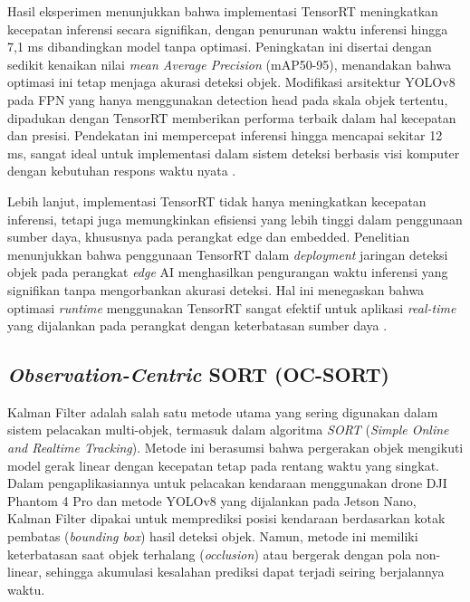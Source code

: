 Hasil eksperimen menunjukkan bahwa implementasi TensorRT meningkatkan kecepatan inferensi secara signifikan, dengan penurunan waktu inferensi hingga 7,1 ms dibandingkan model tanpa optimasi. Peningkatan ini disertai dengan sedikit kenaikan nilai \emph{mean Average Precision} (mAP50-95), menandakan bahwa optimasi ini tetap menjaga akurasi deteksi objek. Modifikasi arsitektur YOLOv8 pada FPN yang hanya menggunakan detection head pada skala objek tertentu, dipadukan dengan TensorRT memberikan performa terbaik dalam hal kecepatan dan presisi. Pendekatan ini mempercepat inferensi hingga mencapai sekitar 12 ms, sangat ideal untuk implementasi dalam sistem deteksi berbasis visi komputer dengan kebutuhan respons waktu nyata \cite{tensorrt}.

Lebih lanjut, implementasi TensorRT tidak hanya meningkatkan kecepatan inferensi, tetapi juga memungkinkan efisiensi yang lebih tinggi dalam penggunaan sumber daya, khususnya pada perangkat edge dan embedded. Penelitian menunjukkan bahwa penggunaan TensorRT dalam \emph{deployment} jaringan deteksi objek pada perangkat \emph{edge} AI menghasilkan pengurangan waktu inferensi yang signifikan tanpa mengorbankan akurasi deteksi. Hal ini menegaskan bahwa optimasi \emph{runtime} menggunakan TensorRT sangat efektif untuk aplikasi \emph{real-time} yang dijalankan pada perangkat dengan keterbatasan sumber daya \cite{stacker2021deployment}.


\subsection{\emph{Observation-Centric} SORT (OC-SORT)}
Kalman Filter adalah salah satu metode utama yang sering digunakan dalam sistem pelacakan multi-objek, termasuk dalam algoritma \emph{SORT} (\emph{Simple Online and Realtime Tracking}). Metode ini berasumsi bahwa pergerakan objek mengikuti model gerak linear dengan kecepatan tetap pada rentang waktu yang singkat. Dalam pengaplikasiannya untuk pelacakan kendaraan menggunakan drone DJI Phantom 4 Pro dan metode YOLOv8 yang dijalankan pada Jetson Nano, Kalman Filter dipakai untuk memprediksi posisi kendaraan berdasarkan kotak pembatas (\emph{bounding box}) hasil deteksi objek. Namun, metode ini memiliki keterbatasan saat objek terhalang (\emph{occlusion}) atau bergerak dengan pola non-linear, sehingga akumulasi kesalahan prediksi dapat terjadi seiring berjalannya waktu.

